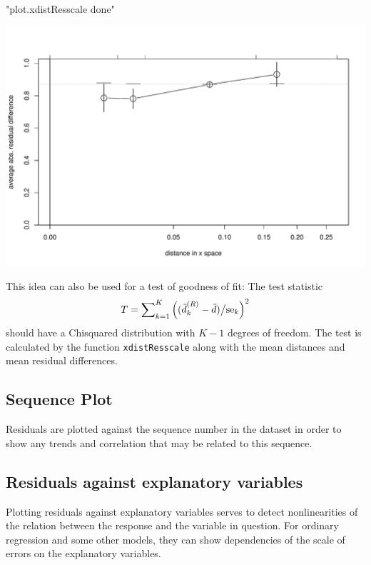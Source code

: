 \documentclass[11pt]{article}
\begin{document}
\Bfig
\begin{Schunk}
\begin{Soutput}
[1] "plot.xdistResscale done"
\end{Soutput}
\end{Schunk}
\includegraphics{regr-description-xdist}

This idea can also be used for a test of goodness of fit: The test
statistic 
$$
  T = \sum\nolimits_{k=1}^K \left((\wb d\sups R_k-\wb d)\big/\mbox{se}_k\right)^2
$$
should have a Chisquared distribution with $K-1$ degrees of freedom.
The test is calculated by the function \texttt{xdistResscale} along with
the mean distances and mean residual differences.

\subsection{Sequence Plot}
Residuals are plotted against the sequence number in the dataset in order
to show any trends and correlation that may be related to this sequence.



\subsection{Residuals against explanatory variables}
Plotting residuals against explanatory variables serves to detect
nonlinearities of the relation between the response and the variable in
question. 
For ordinary regression and some other models, they can show dependencies
of the scale of errors on the explanatory variables.
\end{document}
